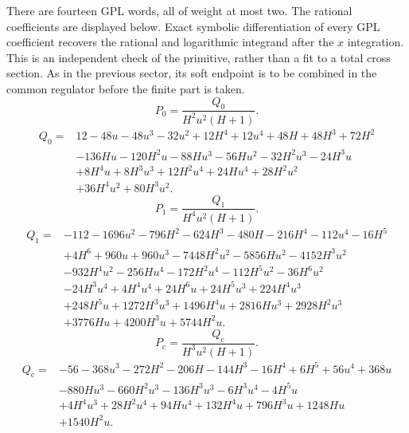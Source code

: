 There are fourteen GPL words, all of weight at most two.
The rational coefficients are displayed below. Exact symbolic
differentiation of every GPL coefficient recovers the rational
and logarithmic integrand after the $x$ integration. This is an
independent check of the primitive, rather than a fit to a total
cross section. As in the previous sector, its soft endpoint is to
be combined in the common regulator before the finite part is taken.
\begin{equation}
P_{0}=\frac{Q_{0}}{H^{2} u^{2} \left(H + 1\right)}.
\end{equation}
\begin{equation}
\begin{aligned}
Q_{0}={}&12 - 48 u - 48 u^{3} - 32 u^{2} + 12 H^{4} + 12 u^{4} + 48 H + 48 H^{3} + 72 H^{2}\\
& - 136 H u - 120 H^{2} u - 88 H u^{3} - 56 H u^{2} - 32 H^{2} u^{3} - 24 H^{3} u\\
& + 8 H^{4} u + 8 H^{3} u^{3} + 12 H^{2} u^{4} + 24 H u^{4} + 28 H^{2} u^{2}\\
& + 36 H^{4} u^{2} + 80 H^{3} u^{2}.
\end{aligned}
\end{equation}
\begin{equation}
P_{1}=\frac{Q_{1}}{H^{4} u^{2} \left(H + 1\right)}.
\end{equation}
\begin{equation}
\begin{aligned}
Q_{1}={}& -112 - 1696 u^{2} - 796 H^{2} - 624 H^{3} - 480 H - 216 H^{4} - 112 u^{4} - 16 H^{5}\\
& + 4 H^{6} + 960 u + 960 u^{3} - 7448 H^{2} u^{2} - 5856 H u^{2} - 4152 H^{3} u^{2}\\
& - 932 H^{4} u^{2} - 256 H u^{4} - 172 H^{2} u^{4} - 112 H^{5} u^{2} - 36 H^{6} u^{2}\\
& - 24 H^{3} u^{4} + 4 H^{4} u^{4} + 24 H^{6} u + 24 H^{5} u^{3} + 224 H^{4} u^{3}\\
& + 248 H^{5} u + 1272 H^{3} u^{3} + 1496 H^{4} u + 2816 H u^{3} + 2928 H^{2} u^{3}\\
& + 3776 H u + 4200 H^{3} u + 5744 H^{2} u.
\end{aligned}
\end{equation}
\begin{equation}
P_{\mathrm c}=\frac{Q_{\mathrm c}}{H^{3} u^{2} \left(H + 1\right)}.
\end{equation}
\begin{equation}
\begin{aligned}
Q_{\mathrm c}={}& -56 - 368 u^{3} - 272 H^{2} - 206 H - 144 H^{3} - 16 H^{4} + 6 H^{5} + 56 u^{4} + 368 u\\
& - 880 H u^{3} - 660 H^{2} u^{3} - 136 H^{3} u^{3} - 6 H^{3} u^{4} - 4 H^{5} u\\
& + 4 H^{4} u^{3} + 28 H^{2} u^{4} + 94 H u^{4} + 132 H^{4} u + 796 H^{3} u + 1248 H u\\
& + 1540 H^{2} u.
\end{aligned}
\end{equation}



